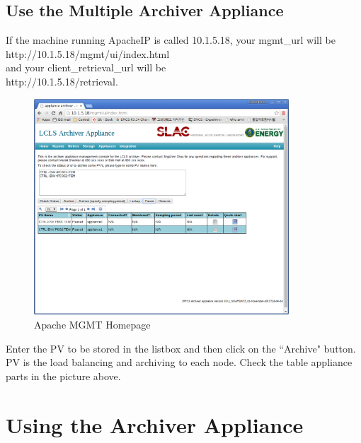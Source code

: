 \documentclass[11pt
  , a4paper
  , article
  , oneside
]{memoir}
\begin{document}
\section{Use the Multiple Archiver Appliance}
If the machine running ApacheIP is called 10.1.5.18, your mgmt\_url will be\\ http://10.1.5.18/mgmt/ui/index.html\\
and your client\_retrieval\_url will be\\ http://10.1.5.18/retrieval.
\begin{figure}[h!]
	\centering
	\includegraphics[width=0.85\textwidth, height=0.5\textwidth]{./images/12.png}
	\caption{Apache MGMT Homepage} 
\end{figure}

Enter the PV to be stored in the listbox and then click on the ``Archive" button. PV is the load balancing and archiving to each node. Check the table appliance parts in the picture above.

\clearpage
\chapter{Using the Archiver Appliance }
\end{document}
